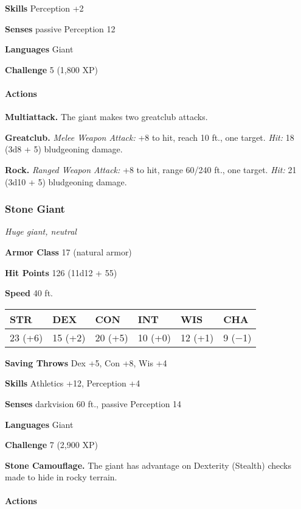 \documentclass[
]{article}
\begin{document}
\textbf{Skills} Perception +2

\textbf{Senses} passive Perception 12

\textbf{Languages} Giant

\textbf{Challenge} 5 (1,800 XP)

\hypertarget{actions-9}{%
\paragraph{Actions}\label{actions-9}}

\textbf{Multiattack.} The giant makes two greatclub attacks.

\textbf{Greatclub.} \emph{Melee Weapon Attack:} +8 to hit, reach 10 ft.,
one target. \emph{Hit:} 18 (3d8 + 5) bludgeoning damage.

\textbf{Rock.} \emph{Ranged Weapon Attack:} +8 to hit, range 60/240 ft.,
one target. \emph{Hit:} 21 (3d10 + 5) bludgeoning damage.

\hypertarget{stone-giant}{%
\subsubsection{Stone Giant}\label{stone-giant}}

\emph{Huge giant, neutral}

\textbf{Armor Class} 17 (natural armor)

\textbf{Hit Points} 126 (11d12 + 55)

\textbf{Speed} 40 ft.

\begin{longtable}[]{@{}llllll@{}}
\toprule
STR & DEX & CON & INT & WIS & CHA\tabularnewline
\midrule
\endhead
23 (+6) & 15 (+2) & 20 (+5) & 10 (+0) & 12 (+1) & 9 (−1)\tabularnewline
\bottomrule
\end{longtable}

\textbf{Saving Throws} Dex +5, Con +8, Wis +4

\textbf{Skills} Athletics +12, Perception +4

\textbf{Senses} darkvision 60 ft., passive Perception 14

\textbf{Languages} Giant

\textbf{Challenge} 7 (2,900 XP)

\textbf{Stone Camouflage.} The giant has advantage on Dexterity
(Stealth) checks made to hide in rocky terrain.

\hypertarget{actions-10}{%
\paragraph{Actions}\label{actions-10}}
\end{document}
